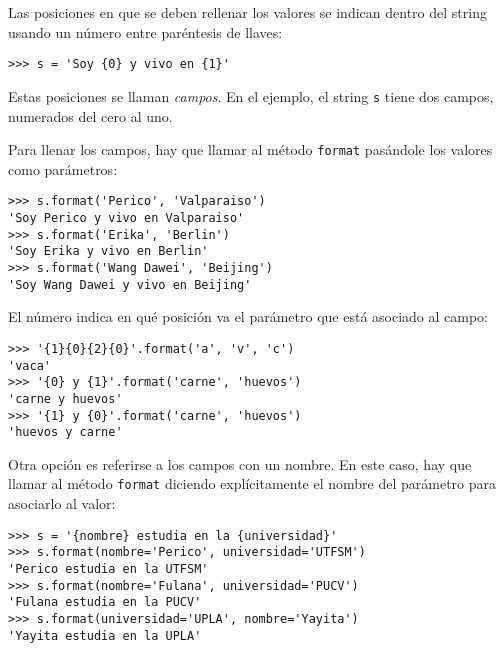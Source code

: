 Las posiciones en que se deben rellenar los valores se indican dentro
del string usando un número entre paréntesis de llaves:

\begin{lstlisting}
>>> s = 'Soy {0} y vivo en {1}'
\end{lstlisting}

Estas posiciones se llaman \emph{campos}. En el ejemplo, el string
\lstinline!s! tiene dos campos, numerados del cero al uno.

Para llenar los campos, hay que llamar al método \lstinline!format!
pasándole los valores como parámetros:

\begin{lstlisting}
>>> s.format('Perico', 'Valparaiso')
'Soy Perico y vivo en Valparaiso'
>>> s.format('Erika', 'Berlin')
'Soy Erika y vivo en Berlin'
>>> s.format('Wang Dawei', 'Beijing')
'Soy Wang Dawei y vivo en Beijing'
\end{lstlisting}

El número indica en qué posición va el parámetro que está asociado al
campo:

\begin{lstlisting}
>>> '{1}{0}{2}{0}'.format('a', 'v', 'c')
'vaca'
>>> '{0} y {1}'.format('carne', 'huevos')
'carne y huevos'
>>> '{1} y {0}'.format('carne', 'huevos')
'huevos y carne'
\end{lstlisting}

Otra opción es referirse a los campos con un nombre. En este caso, hay
que llamar al método \lstinline!format! diciendo explícitamente el
nombre del parámetro para asociarlo al valor:

\begin{lstlisting}
>>> s = '{nombre} estudia en la {universidad}'
>>> s.format(nombre='Perico', universidad='UTFSM')
'Perico estudia en la UTFSM'
>>> s.format(nombre='Fulana', universidad='PUCV')
'Fulana estudia en la PUCV'
>>> s.format(universidad='UPLA', nombre='Yayita')
'Yayita estudia en la UPLA'
\end{lstlisting}

